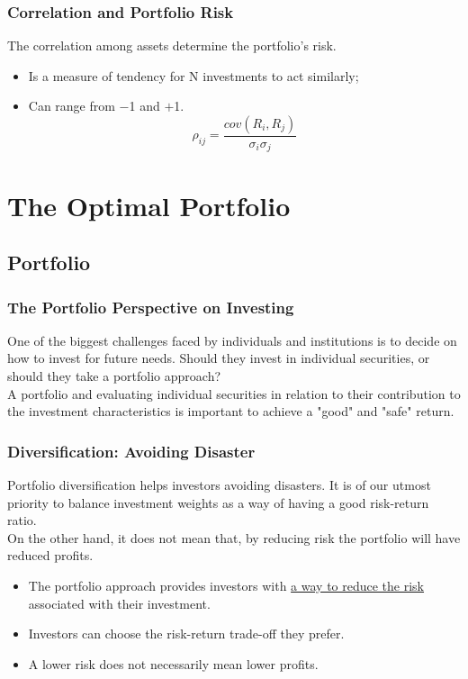 \documentclass[11pt,a4paper]{report}
\begin{document}
\subsection{Correlation and Portfolio Risk}
The correlation among assets determine the portfolio's risk.
\begin{itemize}
    \item Is a measure of tendency for N investments to act similarly;
    \item Can range from $-$1 and $+$1.
    \[\rho_{ij} = \frac{cov(R_i,R_j)}{\sigma_i \sigma_j}\]
\end{itemize}

\chapter{The Optimal Portfolio}
\section{Portfolio}
\subsection{The Portfolio Perspective on Investing}
One of the biggest challenges faced by individuals and institutions is to decide on how to invest for future needs. Should they invest in individual securities, or should they take a portfolio approach?
\\A portfolio and evaluating individual securities in relation to their contribution to the investment characteristics is important to achieve a "good" and "safe" return.
\subsection{Diversification: Avoiding Disaster}
Portfolio diversification helps investors avoiding disasters. It is of our utmost priority to balance investment weights as a way of having a good risk-return ratio.
\\On the other hand, it does not mean that, by reducing risk the portfolio will have reduced profits.
\begin{itemize}
    \item The portfolio approach provides investors with \underline{a way to reduce the risk} associated with their investment.
    \item Investors can choose the risk-return trade-off they prefer.
    \item A lower risk does not necessarily mean lower profits.
\end{itemize}
\end{document}
